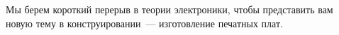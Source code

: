 \secdown

Мы берем короткий перерыв в теории электроники, чтобы представить вам новую тему
в конструировании\ --- изготовление печатных плат.








\secup
